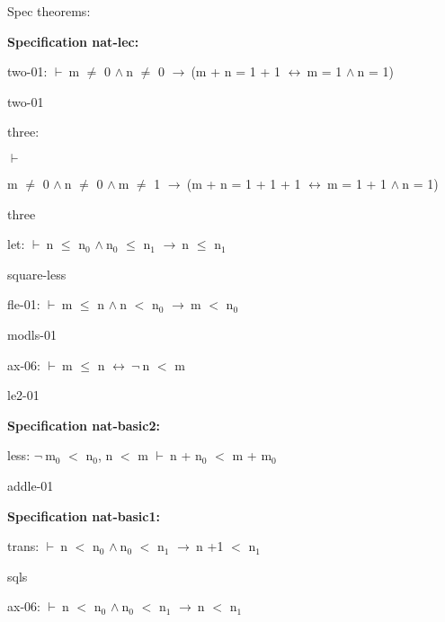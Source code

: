 \documentclass[a4paper]{article}
\newcommand{\Fol}{\mbox{$\vdash\ $}}
\newcommand{\Not}{\mbox{$\neg\ $}}
\newcommand{\And}{\mbox{$\wedge\ $}}
\newcommand{\Imp}{\mbox{$\rightarrow\ $}}
\newcommand{\Equiv}{\mbox{$\leftrightarrow\ $}}
\begin{document}
\raggedright
              
Spec theorems: 


{\bf Specification nat-lec:}

two-01: 
 \Fol m $\neq$ 0 \And n $\neq$ 0 \Imp (m + n = 1 + 1 \Equiv m = 1 \And n = 1)



two-01

\bigskip

three: 
\begin{flushleft}


\Fol

m $\neq$ 0 \And n $\neq$ 0 \And m $\neq$ 1 \Imp (m + n = 1 + 1 + 1 \Equiv m = 1 + 1 \And n = 1)

\end{flushleft}



three

\bigskip

let: 
 \Fol n $\le$ $\mbox{n}_{0}$ \And $\mbox{n}_{0}$ $\le$ $\mbox{n}_{1}$ \Imp n $\le$ $\mbox{n}_{1}$



square-less

\bigskip

fle-01: 
 \Fol m $\le$ n \And n $<$ $\mbox{n}_{0}$ \Imp m $<$ $\mbox{n}_{0}$



modls-01

\bigskip

ax-06: 
 \Fol m $\le$ n \Equiv \Not n $<$ m



le2-01

\bigskip

{\bf Specification nat-basic2:}

less: 
\Not $\mbox{m}_{0}$ $<$ $\mbox{n}_{0}$, 
n $<$ m
 \Fol n + $\mbox{n}_{0}$ $<$ m + $\mbox{m}_{0}$



addle-01

\bigskip

{\bf Specification nat-basic1:}

trans: 
 \Fol n $<$ $\mbox{n}_{0}$ \And $\mbox{n}_{0}$ $<$ $\mbox{n}_{1}$ \Imp n +1 $<$ $\mbox{n}_{1}$



sqls

\bigskip

ax-06: 
 \Fol n $<$ $\mbox{n}_{0}$ \And $\mbox{n}_{0}$ $<$ $\mbox{n}_{1}$ \Imp n $<$ $\mbox{n}_{1}$
\end{document}

